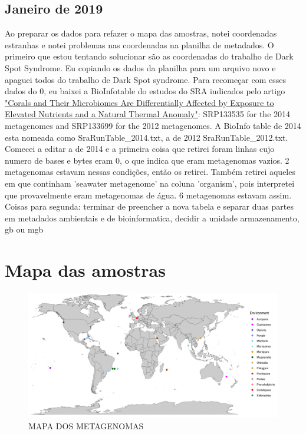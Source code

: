 \documentclass[12pt, a4paper]{report}
\begin{document}
\subsection{Janeiro de 2019}

Ao preparar os dados para refazer o mapa das amostras, notei coordenadas estranhas e notei problemas nas coordenadas na planilha de metadados. O primeiro que estou tentando solucionar são as coordenadas do trabalho de Dark Spot Syndrome. Eu copiando os dados da planilha para um arquivo novo e apaguei todos do trabalho de Dark Spot syndrome. Para recomeçar com esses dados do 0, eu baixei a BioInfotable do estudos do SRA indicados pelo artigo \href{https://www.frontiersin.org/articles/10.3389/fmars.2018.00101/full}{"Corals and Their Microbiomes Are Differentially Affected by Exposure to Elevated Nutrients and a Natural Thermal Anomaly"}: SRP133535 for the 2014 metagenomes and SRP133699 for the 2012 metagenomes. A BioInfo table de 2014 esta nomeada como SraRunTable\_2014.txt, a de 2012 SraRunTable\_2012.txt. Comecei a editar a de 2014 e a primeira coisa que retirei foram linhas cujo numero de bases e bytes eram 0, o que indica que eram metagenomas vazios. 2 metagenomas estavam nessas condições, então os retirei. Também retirei aqueles em que continham 'seawater metagenome' na coluna 'organism', pois interpretei que provavelmente eram metagenomas de água. 6 metagenomas estavam assim. 
Coisas para segunda: terminar de preencher a nova tabela e separar duas partes em metadados ambientais e de bioinformatica, decidir a unidade armazenamento, gb ou mgb

\section{Mapa das amostras}

\begin{figure}[H]
	\centering
	\includegraphics[scale=0.5]{figures/aquifers_map_leticia_3.png}
	\caption{MAPA DOS METAGENOMAS}
	\label{fig:MAPA DOS METAGENOMAS DE CORAIS}
\end{figure}
\end{document}
